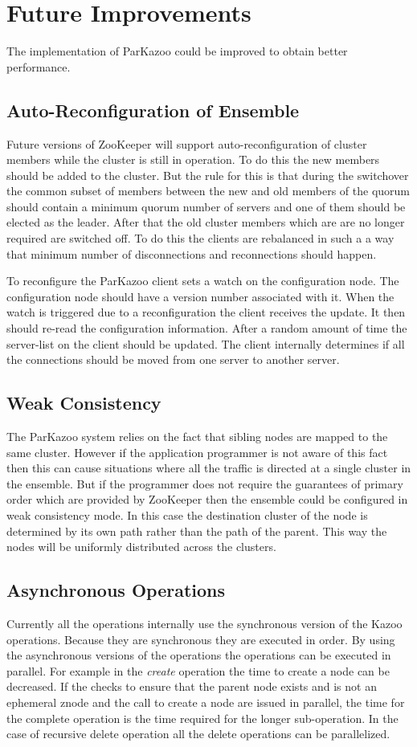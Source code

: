 \chapter{Future Improvements}
The implementation of ParKazoo could be improved to obtain better performance. 

\section{Auto-Reconfiguration of Ensemble}
Future versions of ZooKeeper will support auto-reconfiguration of cluster members while the cluster is still in operation. To do this the new members should be added to the cluster. But the rule for this is that during the switchover the common subset of members between the new and old members of the quorum should contain a minimum quorum number of servers and one of them should be elected as the leader. After that the old cluster members which are are no longer required are switched off. To do this the clients are rebalanced in such a a way that minimum number of disconnections and reconnections should happen. 

To reconfigure the ParKazoo client sets a watch on the configuration node. The configuration node should have a version number associated with it. When the watch is triggered due to a reconfiguration the client receives the update. It then should re-read the configuration information. After a random amount of time the server-list on the client should be updated. The client internally determines if all the connections should be moved from one server to another server.

\section{Weak Consistency}
The ParKazoo system relies on the fact that sibling nodes are mapped to the same cluster. However if the application programmer is not aware of this fact then this can cause situations where all the traffic is directed at a single cluster in the ensemble. But if the programmer does not require the guarantees of primary order which are provided by ZooKeeper then the ensemble could be configured in weak consistency mode. In this case the destination cluster of the node is determined by its own path rather than the path of the parent. This way the nodes will be uniformly distributed across the clusters.

\section{Asynchronous Operations}
Currently all the operations internally use the synchronous version of the Kazoo operations. Because they are synchronous they are executed in order. By using the asynchronous versions of the operations the operations can be executed in parallel. For example in the \textit{create} operation the time to create a node can be decreased. If the checks to ensure that the parent node exists and is not an ephemeral znode and the call to create a node are issued in parallel, the time for the complete operation is the time required for the longer sub-operation. In the case of recursive delete operation all the delete operations can be parallelized.